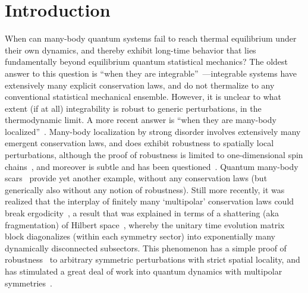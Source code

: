 








\section{Introduction}

When can many-body quantum systems fail to reach thermal equilibrium under their own dynamics, and thereby exhibit long-time behavior that lies fundamentally beyond equilibrium quantum statistical mechanics? The oldest answer to this question is ``when they are integrable''~\cite{Baxter2016Exactly}---integrable systems have extensively many explicit conservation laws, and do not thermalize to any conventional statistical mechanical ensemble. However, it is unclear to what extent (if at all) integrability is robust to generic perturbations, in the thermodynamic limit. A more recent answer is ``when they are many-body localized''~\cite{Nandkishore2015MBL, Abanin2019MBL}. Many-body localization by strong disorder involves extensively many emergent conservation laws, and does exhibit robustness to spatially local perturbations, although the proof of robustness is limited to one-dimensional spin chains~\cite{Imbrie2016MBL}, and moreover is subtle and has been questioned~\cite{Sels2021Obstruction}. Quantum many-body scars~\cite{Shiraishi2017ETH, Moudgalya2018AKLT, Turner2018Scarred, Chandran2023Scars} provide yet another example, without any conservation laws (but generically also without any notion of robustness). Still more recently, it was realized that the interplay of finitely many `multipolar' conservation laws could break ergodicity~\cite{Pai2019Localization}, a result that was explained in terms of a shattering (aka fragmentation) of Hilbert space~\cite{Khemani2020Localization, Sala2020Fragmentation, Moudgalya2022Thermalization}, whereby the unitary time evolution matrix block diagonalizes (within each symmetry sector) into exponentially many dynamically disconnected subsectors. This phenomenon has a simple proof of robustness~\cite{Khemani2020Localization} to arbitrary symmetric perturbations with strict spatial locality, and has stimulated a great deal of work into quantum dynamics with multipolar symmetries~\cite{Rakovszky2020SLIOM, Yang2020Confinement, Khudorozhkov2022Fragmentation, Moudgalya2022Commutant, Yoshinaga2022Ising, Hart2022Shattering, Bulmash2023Multipole, Gromov2020Fracton, Iaconis2019Subdiffusion, Glorioso2022Breakdown, RichterPal2022, Iaconis2021Multipole, Glorioso2021Nonabelian, Grosvenor2021Hydrodynamics, Osborne2021FractonFluids, Feldmeier2020Anomalous, Sala2022Modulated, Hart2022Quasiconservation, Qi2023FractonMHD, Guo2022Fracton, Glorioso2023Goldstone}. 

